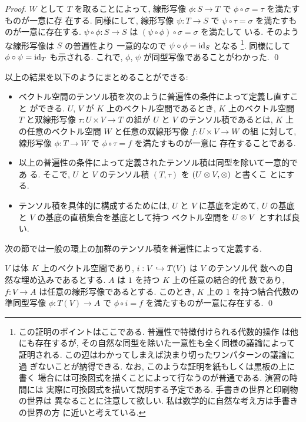\documentclass[12pt,twoside]{jarticle}
\begin{document}
\begin{proof}
  $W$ として $T$ を取ることによって, 
  線形写像 $\phi: S \to T$ で $\phi\circ\sigma=\tau$ を満たすものが一意に存
  在する.
  同様にして, 線形写像 $\psi: T \to S$ で $\psi\circ\tau=\sigma$ を満たすも
  のが一意に存在する.
  $\psi\circ\phi: S\to S$ は $(\psi\circ\phi)\circ\sigma=\sigma$ を満たして
  いる. そのような線形写像は $S$ の普遍性より
  一意的なので $\psi\circ\phi=\mathop{\mathrm{id}}\nolimits_S$ となる%
  \footnote{この証明のポイントはここである. 普遍性で特徴付けられる代数的操作
    は他にも存在するが, その自然な同型を除いた一意性も全く同様の議論によって
    証明される.  この辺はわかってしまえば決まり切ったワンパターンの議論に過
    ぎないことが納得できる.  なお, このような証明を紙もしくは黒板の上に書く
    場合には可換図式を描くことによって行なうのが普通である.  演習の時間には
    実際に可換図式を描いて説明する予定である.  手書きの世界と印刷物の世界は
    異なることに注意して欲しい.  私は数学的に自然な考え方は手書きの世界の方
    に近いと考えている.}.  %
  同様にして $\phi\circ\psi=\mathop{\mathrm{id}}\nolimits_T$ も示される.  
  これで, $\phi$, $\psi$ が同型写像であることがわかった.  \qed
\end{proof}

以上の結果を以下のようにまとめることができる:
\begin{itemize}
\item ベクトル空間のテンソル積を次のように普遍性の条件によって定義し直すこと
  ができる. 
  $U$, $V$ が $K$ 上のベクトル空間であるとき, 
  $K$ 上のベクトル空間 $T$ と双線形写像 $\tau:U\times V\to T$ の組が
  $U$ と $V$ のテンソル積であるとは, %
  $K$ 上の任意のベクトル空間 $W$ と任意の双線形写像 $f:U\times V\to W$ の組
  に対して, 線形写像 $\phi:T\to W$ で $\phi\circ\tau=f$ を満たすものが一意に
  存在することである.
\item 以上の普遍性の条件によって定義されたテンソル積は同型を除いて一意的であ
  る.  そこで, $U$ と $V$ のテンソル積 $(T, \tau)$ を $(U\otimes V, \otimes)$ と書くこ
  とにする.
\item テンソル積を具体的に構成するためには, $U$ と $V$ に基底を定めて, 
  $U$ の基底と $V$ の基底の直積集合を基底として持つ
  ベクトル空間を $U\otimes V$ とすれば良い.
\end{itemize}
次の節では一般の環上の加群のテンソル積を普遍性によって定義する.

\begin{question}[テンソル代数の普遍性]
  $V$ は体 $K$ 上のベクトル空間であり, $i:V\hookrightarrow T(V)$ は $V$ のテンソル代
  数への自然な埋め込みであるとする. $A$ は $1$ を持つ $K$ 上の任意の結合的代
  数であり, $f:V\to A$ は任意の線形写像であるとする. 
  このとき, $K$ 上の $1$ を持つ結合代数の準同型写像 $\phi:T(V)\to A$ 
  で $\phi\circ i=f$ を満たすものが一意に存在する. \qed
\end{question}
\end{document}
